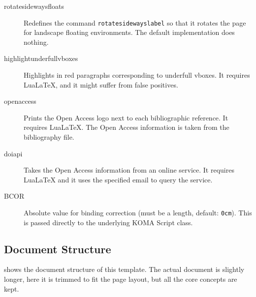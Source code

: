 \begin{description}
    \item[rotatesidewaysfloats] Redefines the command \texttt{rotatesidewayslabel} so that it rotates the page for landscape floating environments.
        The default implementation does nothing.
    \item[highlightunderfullvboxes] Highlights in red paragraphs corresponding to underfull vboxes.
        It requires Lua\LaTeX{}, and it might suffer from false positives.
    \item[openaccess] Prints the Open Access logo next to each bibliographic reference.
        It requires Lua\LaTeX{}.
        The Open Access information is taken from the bibliography file.
    \item[doiapi] Takes the Open Access information from an online service.
        It requires Lua\LaTeX{} and it uses the specified email to query the service.
    \item[BCOR] Absolute value for binding correction (must be a length, default: \texttt{0cm}).
        This is passed directly to the underlying KOMA Script class.
\end{description}


\subsection{Document Structure}

 shows the document structure of this template.
The actual document is slightly longer, here it is trimmed to fit the page layout, but all the core concepts are kept.

